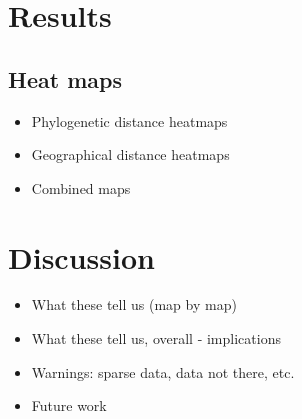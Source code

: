 \documentclass[11pt]{article}
\begin{document}
\section{Results} %
\subsection{Heat maps}
\begin{itemize}
\item Phylogenetic distance heatmaps
\item Geographical distance heatmaps
\item Combined maps
\end{itemize}


\section{Discussion}
\begin{itemize}
\item What these tell us (map by map)
\item What these tell us, overall - implications
\item Warnings: sparse data, data not there, etc. 
\item Future work 
%
\end{itemize}



\end{document}
